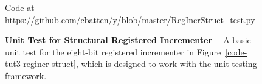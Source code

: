 
\begin{figure}

  

  \centerline{\small Code at
    \url{https://github.com/cbatten/y/blob/master/RegIncrStruct_test.py}}

  \caption{\textbf{Unit Test for Structural Registered Incrementer --} A
    basic unit test for the eight-bit registered incrementer in
    Figure~\ref{code-tut3-regincr-struct}, which is designed to work with
    the  unit testing framework.}
  \label{code-tut3-regincr-struct-test}

\end{figure}

